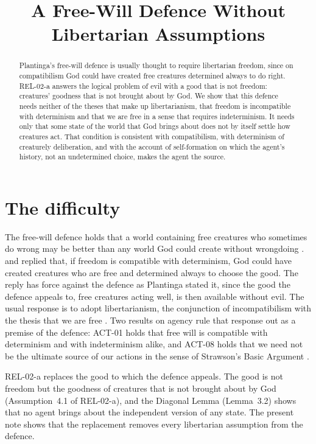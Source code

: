 \documentclass{situationist-preprint}
\title{A Free-Will Defence Without Libertarian Assumptions}
\begin{document}
\maketitle

\begin{abstract}
Plantinga's free-will defence is usually thought to require libertarian freedom, since on compatibilism God could have created free creatures determined always to do right. REL-02-a answers the logical problem of evil with a good that is not freedom: creatures' goodness that is not brought about by God. We show that this defence needs neither of the theses that make up libertarianism, that freedom is incompatible with determinism and that we are free in a sense that requires indeterminism. It needs only that some state of the world that God brings about does not by itself settle how creatures act. That condition is consistent with compatibilism, with determinism of creaturely deliberation, and with the account of self-formation on which the agent's history, not an undetermined choice, makes the agent the source.
\end{abstract}

\section{The difficulty}

The free-will defence holds that a world containing free creatures who sometimes do wrong may be better than any world God could create without wrongdoing \citep{Plantinga1974}. \citet{Mackie1955} and \citet{Flew1955} replied that, if freedom is compatible with determinism, God could have created creatures who are free and determined always to choose the good. The reply has force against the defence as Plantinga stated it, since the good the defence appeals to, free creatures acting well, is then available without evil. The usual response is to adopt libertarianism, the conjunction of incompatibilism with the thesis that we are free \citep{Kane1996}. Two results on agency rule that response out as a premise of the defence: ACT-01 holds that free will is compatible with determinism and with indeterminism alike, and ACT-08 holds that we need not be the ultimate source of our actions in the sense of Strawson's Basic Argument \citep{Strawson1994}.

REL-02-a replaces the good to which the defence appeals. The good is not freedom but the goodness of creatures that is not brought about by God (Assumption~4.1 of REL-02-a), and the Diagonal Lemma (Lemma~3.2) shows that no agent brings about the independent version of any state. The present note shows that the replacement removes every libertarian assumption from the defence.
\end{document}
